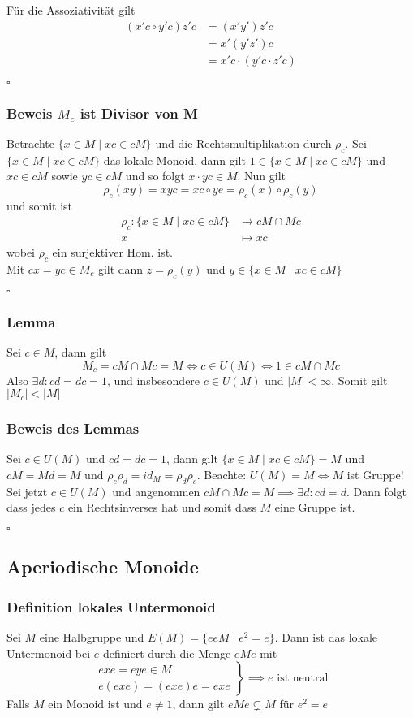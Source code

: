 \documentclass[12pt, german]{article}
\newcommand{\bewiesen}{
	
	\begin{flushright}
		$\square$  \\
\end{flushright}}
\begin{document}
	Für die Assoziativität gilt 
	\begin{align*}
		(x'c \circ y'c)z'c &= (x'y')z'c \\
		&= x'(y'z')c \\
		&= x'c \cdot (y'c \cdot z'c)
	\end{align*}
	\bewiesen
	
	\subsubsection{Beweis $M_c$ ist Divisor von M}
	Betrachte $\{x \in M \mid xc \in cM\}$ und die Rechtsmultiplikation durch $\rho_c$. Sei $\{x \in M \mid xc \in cM\}$ das lokale Monoid, dann gilt $1 \in \{x \in M \mid xc \in cM\}$ und $xc \in cM$ sowie $yc \in cM$ und so folgt $x \cdot yc \in M$. Nun gilt $$\rho_c(xy) = xyc = xc \circ ye = \rho_c(x) \circ \rho_c(y)$$ und somit ist 
	\begin{align*}
		\rho_c : \{x \in M \mid xc \in cM\} &\to cM \cap Mc \\
		x &\mapsto xc
	\end{align*} wobei $\rho_c$ ein surjektiver Hom. ist. \\
	Mit $cx = yc \in M_c$ gilt dann $z = \rho_c(y)$ und $y \in \{x \in M \mid xc \in cM\}$
	\bewiesen
	
	\subsubsection{Lemma}
	Sei $c\in M$, dann gilt $$M_c = cM \cap Mc = M \iff c \in U(M) \iff 1 \in cM \cap Mc$$
	Also $\exists d : cd = dc = 1$, und insbesondere $c \in U(M)$ und $|M| < \infty$. Somit gilt $|M_c| < |M|$
	
	\subsubsection{Beweis des Lemmas}
	Sei $c \in U(M)$ und $cd = dc = 1$, dann gilt $\{x \in M \mid xc \in cM\}  = M$ und $cM = Md = M$ und $\rho_c\rho_d = id_M = \rho_d\rho_c$. 
	Beachte: $U(M) = M \iff M$ ist Gruppe! 
	Sei jetzt $c \in U(M)$ und angenommen $cM \cap Mc = M \implies \exists d : cd = d$. Dann folgt dass jedes $c$ ein Rechtsinverses hat und somit dass $M$ eine Gruppe ist.
	\bewiesen
	
	\subsection{Aperiodische Monoide}
	\subsubsection{Definition lokales Untermonoid}
	Sei $M$ eine Halbgruppe  und $E(M) = \{eeM \mid e^2 = e\}$. Dann ist das lokale Untermonoid bei $e$ definiert durch die Menge $eMe$ mit 
	\[
	\left. 
	\begin{array}{lr}
		exe = eye \in M\\
		e(exe) = (exe)e = exe 
	\end{array}\right\} \implies e \text{ ist neutral}
	\]
	Falls $M$ ein Monoid ist und $e\not = 1$, dann gilt $eMe \subsetneq M$ für $e^2 = e$
	
\end{document}

